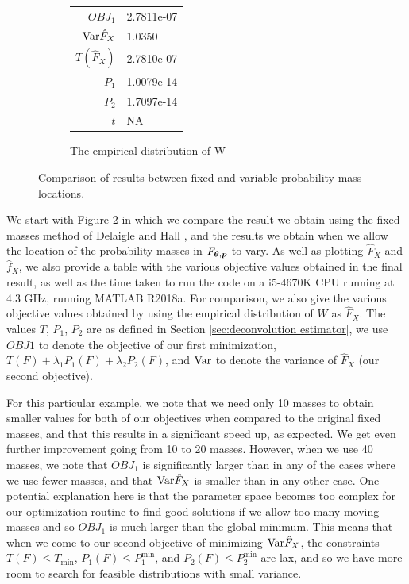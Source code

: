 \begin{figure}
\begin{subfigure}[b]{0.49\textwidth}
		\begin{tabular}{r l}
			$OBJ_1$ & 2.7811e-07\\
			$\mathrm{Var} \hat{F}_X$ & 1.0350\\
			$T(\hat{F}_X)$ & 2.7810e-07\\
			$P_1$ & 1.0079e-14\\
			$P_2$ & 1.7097e-14\\
			$t$ & NA
		\end{tabular}
		\caption{The empirical distribution of W}
		\label{fig:emp masses example}
	\end{subfigure}
	
	\caption{Comparison of results between fixed and variable probability mass locations.}
	\label{fig:compare fixed moving masses}
\end{figure}

We start with Figure \ref{fig:compare fixed moving masses} in which we compare the result we obtain using the fixed masses method of Delaigle and Hall \cite{Delaigle2016-la}, and the results we obtain when we allow the location of the probability masses in $F_{{\bm{{\theta}}}, {\bm{{p}}}}$ to vary. As well as plotting $\hat{F}_X$ and $\hat{f}_X$, we also provide a table with the various objective values obtained in the final result, as well as the time taken to run the code on a i5-4670K CPU running at 4.3 GHz, running MATLAB R2018a. For comparison, we also give the various objective values obtained by using the empirical distribution of $W$ as $\hat{F}_X$. The values $T$, $P_1$, $P_2$ are as defined in Section \ref{sec:deconvolution estimator}, we use $OBJ1$ to denote the objective of our first minimization, $T(F) + \lambda_1 P_1(F) + \lambda_2 P_2(F)$, and $\mathrm{Var}$ to denote the variance of $\hat{F}_X$ (our second objective).

For this particular example, we note that we need only 10 masses to obtain smaller values for both of our objectives when compared to the original fixed masses, and that this results in a significant speed up, as expected. We get even further improvement going from 10 to 20 masses. However, when we use 40 masses, we note that $OBJ_1$ is significantly larger than in any of the cases where we use fewer masses, and that $\mathrm{Var}\hat{F}_X$ is smaller than in any other case. One potential explanation here is that the parameter space becomes too complex for our optimization routine to find good solutions if we allow too many moving masses and so $OBJ_1$ is much larger than the global minimum. This means that when we come to our second objective of minimizing $\mathrm{Var} \hat{F}_X$, the constraints $T(F) \leq T_\mathrm{min}$, $P_1(F) \leq P_1^\mathrm{min}$, and $P_2(F) \leq P_2^\mathrm{min}$ are lax, and so we have more room to search for feasible distributions with small variance.

